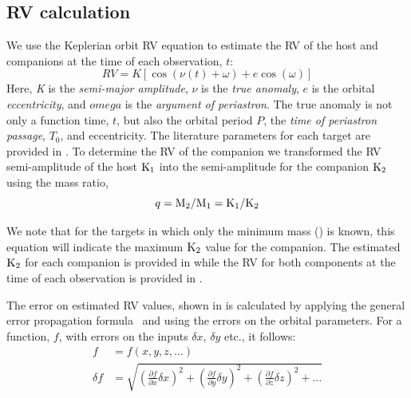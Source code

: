 \subsection{{RV} calculation}
We use the Keplerian orbit {RV} equation to estimate the {RV} of the host and companions at the time of each observation, \(t\):
\begin{equation}
\label{eq:rv_equation}
{RV} = K [\cos{(\nu(t) + \omega)} + e\cos{(\omega)}]
\end{equation}
Here, \emph{K} is the \emph{semi-major amplitude}, \(\nu\) is the \emph{true anomaly}, \(e\) is the orbital \emph{eccentricity}, and \(omega\) is the \emph{argument of periastron}.
The true anomaly is not only a function time, \(t\), but also the orbital period \(P\), the \emph{time of periastron passage}, \(T_0\), and eccentricity.
The literature parameters for each target are provided in .
To determine the {RV} of the companion we transformed the {RV} semi-amplitude of the host \(\textrm{K}_{1}\) into the semi-amplitude for the companion \(\textrm{K}_{2}\) using the mass ratio,
\begin{equation}
\label{eqn:mass_ratio}
q = \textrm{M}_{2} / \textrm{M}_{1} = \textrm{K}_{1} / \textrm{K}_{2}
\end{equation}

We note that for the targets in which only the minimum mass (\mtwosini) is known, this equation will indicate the maximum \(\textrm{K}_{2}\) value for the companion. The estimated \(\textrm{K}_{2}\) for each companion is provided in  while the {RV} for both components at the time of each observation is provided in .


The error on estimated {RV} values, shown in  is calculated by applying the general error propagation formula~\citep{ku_notes_1966} and using the  errors on the orbital parameters. For a function, \(f\), with errors on the inputs \(\delta x\), \(\delta y\) etc., it follows:
\begin{align}
f &= f(x, y, z, \ldots)\\
\delta f &= \sqrt{{\left( \frac{\partial f}{\partial x} \delta x\right)}^2 + {\left(\frac{\partial f}{\partial y} \delta y\right)}^2 + {\left(\frac{\partial f}{\partial z} \delta z\right)}^2 + \ldots}
\end{align}




